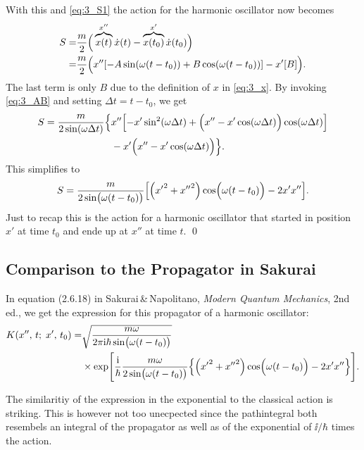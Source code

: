 \documentclass[11pt,letter, swedish, english
]{article}
\begin{document}
With this and \eqref{eq:3_S1} the action for the harmonic oscillator
now becomes
\begin{equation}
\begin{aligned}
S=&\frac{m}{2}\Big(\overbrace{x(t)}^{x''}\dot{x}(t)
-\overbrace{x(t_0)}^{x'}\dot{x}(t_0)\Big)\\
=&\frac{m}{2}\Big(x''\qty[-A\sin(\omega(t-t_0))+B\cos(\omega(t-t_0))]
-x'\qty[B]\Big).
\end{aligned}
\end{equation}
The last term is only $B$ due to the definition of $x$ in
\eqref{eq:3_x}. By invoking \eqref{eq:3_AB} and setting
$\Delta{t}=t-t_0$, we get 
\begin{equation}
\begin{aligned}
S=\frac{m}{2\sin(\omega\Delta{t})}
\Big\{ &x''\qty[-x'\sin^2(\omega\Delta{t})
+\Big(x''-x'\cos(\omega\Delta{t})\Big)\cos(\omega\Delta{t})]
\\ &
-x'\Big(x''-x'\cos(\omega\Delta{t})\Big)\Big\}.
\end{aligned}
\end{equation}
This simplifies to
\begin{equation}
S=\frac{m}{2\sin(\omega(t-t_0)\big.)}
\qty[\qty({x'}^2+{x''}^2)\cos(\omega(t-t_0)\Big.)-2x'x''].
\end{equation}
Just to recap this is the action for a harmonic oscillator that
started in position $x'$ at time $t_0$ and ende up at $x''$ at time
$t$. 
\qed

\subsection{Comparison to the Propagator in Sakurai}
In equation (2.6.18) in Sakurai\,\&\,Napolitano, \textit{Modern
  Quantum Mechanics}, 2nd ed., we get the expression for this
propagator of a harmonic oscillator:
\begin{equation}
\begin{aligned}
K(x'',\, t;\; x',\,t_0)=&
\sqrt{\frac{m\omega}{2\pi\mathrm{i}\hbar\sin(\omega(t-t_0)\big.)}}\\
&\times \exp[\frac{\mathrm{i}}{\hbar}\frac{m\omega}{2\sin(\omega(t-t_0)\big.)}
\qty{\qty({x'}^2+{x''}^2)\cos(\omega(t-t_0)\Big.)-2x'x''}].
\end{aligned}
\end{equation}

The similaritiy of the expression in the exponential to the classical
action is striking. This is however not too unecpected since the
pathintegral both resembels an integral of the propagator as well as
of the exponential of $\ii/\hbar$ times the action. 
\end{document}
